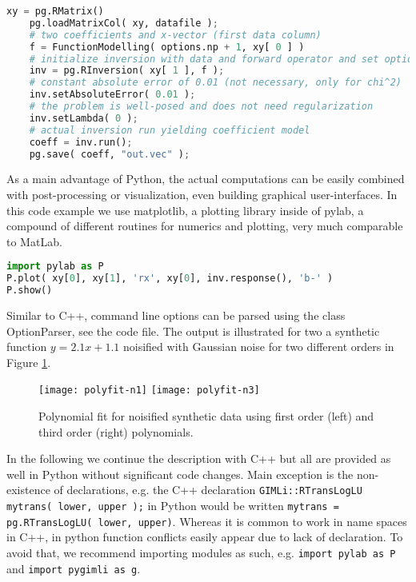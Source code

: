 \begin{lstlisting}[language=python]
    xy = pg.RMatrix()
    pg.loadMatrixCol( xy, datafile );
    # two coefficients and x-vector (first data column)
    f = FunctionModelling( options.np + 1, xy[ 0 ] )
    # initialize inversion with data and forward operator and set options
    inv = pg.RInversion( xy[ 1 ], f );
    # constant absolute error of 0.01 (not necessary, only for chi^2)
    inv.setAbsoluteError( 0.01 );
    # the problem is well-posed and does not need regularization
    inv.setLambda( 0 );
    # actual inversion run yielding coefficient model
    coeff = inv.run();
    pg.save( coeff, "out.vec" );
\end{lstlisting}

As a main advantage of Python, the actual computations can be easily combined with post-processing or visualization, even building graphical user-interfaces. 
In this code example we use matplotlib, a plotting library inside of pylab, a compound of different routines for numerics and plotting, very much comparable to MatLab.

\begin{lstlisting}[language=python]
import pylab as P
P.plot( xy[0], xy[1], 'rx', xy[0], inv.response(), 'b-' )
P.show()
\end{lstlisting}

Similar to C++, command line options can be parsed using the class OptionParser, see the code file.
The output is illustrated for two a synthetic function $y=2.1x+1.1$ noisified with Gaussian noise for two different orders in Figure \ref{fig:polyfit}.

\begin{figure}[hbt]%
\texttt{[image: polyfit-n1]}\hfill
\texttt{[image: polyfit-n3]}%
\caption{Polynomial fit for noisified synthetic data using first order (left) and third order (right) polynomials.}%
\label{fig:polyfit}%
\end{figure}

In the following we continue the description with C++ but all are provided as well in Python without significant code changes.
Main exception is the non-existence of declarations, e.g. the C++ declaration \lstinline|GIMLi::RTransLogLU mytrans( lower, upper );| in Python would be written \lstinline|mytrans = pg.RTransLogLU( lower, upper)|.
Whereas it is common to work in name spaces in C++, in python function conflicts easily appear due to lack of declaration.
To avoid that, we recommend importing modules as such, e.g. \lstinline|import pylab as P| and \lstinline|import pygimli as g|.

